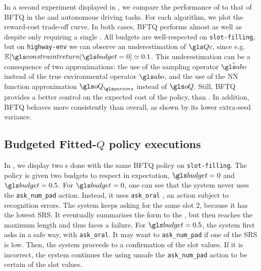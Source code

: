 In a second experiment displayed in , we compare the performance of \FTQl to that of \gls{BFTQ} in the   and autonomous driving tasks. For each algorithm, we plot the reward-cost trade-off curve. In both cases, \gls{BFTQ} performs almost as well as \FTQl despite only requiring a single . All budgets are well-respected on \texttt{slot-filling}, but on \texttt{highway-env} we can observe an underestimation of $\Qc$, since e.g. $\expectedvalue[\constraintreturn|\budget=0] \simeq 0.1 $. This underestimation can be a consequence of two approximations: the use of the sampling operator $\hat{\abo}$ instead of the true environmental operator $\abo$, and the use of the \gls{NN} function approximation $\oQ_{\params}$ instead of $\oQ$.
Still, \gls{BFTQ} provides a better control on the expected cost of the policy, than \FTQl. In addition, \gls{BFTQ} behaves more consistently than \FTQl overall, as shown by its lower extra-seed variance.

\subsection{Budgeted Fitted-$Q$ policy executions}

In , we display two s done with the same \gls{BFTQ} policy on \texttt{slot-filling}. The policy is given two budgets to respect in expectation, $\budget=0$ and $\budget=0.5$. For $\budget=0$, one can see that the system never uses the \texttt{ask\_num\_pad} action. Instead, it uses \texttt{ask\_oral} , an action subject to recognition errors. The system keeps asking for the same slot 2, because it has the lowest \gls{SRS}. It eventually summarises the form to the , but then reaches the maximum  length and thus faces a  failure. For $\budget=0.5$, the system first asks in a safe way, with \texttt{ask\_oral}. It may want to \texttt{ask\_num\_pad} if one of the \gls{SRS} is low. Then, the system proceeds to a confirmation of the slot values. If it is incorrect, the system continues the  using unsafe the \texttt{ask\_num\_pad} action to be certain of the slot values.


